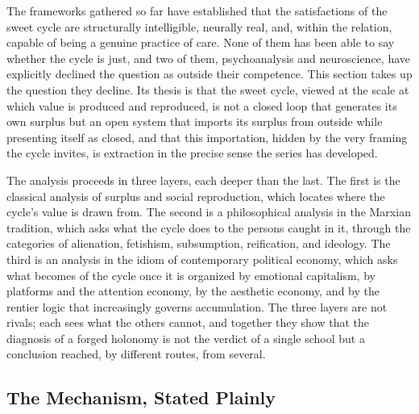 The frameworks gathered so far have established that the satisfactions of the sweet cycle are structurally intelligible, neurally real, and, within the relation, capable of being a genuine practice of care. None of them has been able to say whether the cycle is just, and two of them, psychoanalysis and neuroscience, have explicitly declined the question as outside their competence. This section takes up the question they decline. Its thesis is that the sweet cycle, viewed at the scale at which value is produced and reproduced, is not a closed loop that generates its own surplus but an open system that imports its surplus from outside while presenting itself as closed, and that this importation, hidden by the very framing the cycle invites, is extraction in the precise sense the series has developed.

The analysis proceeds in three layers, each deeper than the last. The first is the classical analysis of surplus and social reproduction, which locates where the cycle's value is drawn from. The second is a philosophical analysis in the Marxian tradition, which asks what the cycle does to the persons caught in it, through the categories of alienation, fetishism, subsumption, reification, and ideology. The third is an analysis in the idiom of contemporary political economy, which asks what becomes of the cycle once it is organized by emotional capitalism, by platforms and the attention economy, by the aesthetic economy, and by the rentier logic that increasingly governs accumulation. The three layers are not rivals; each sees what the others cannot, and together they show that the diagnosis of a forged holonomy is not the verdict of a single school but a conclusion reached, by different routes, from several.

\subsection{The Mechanism, Stated Plainly}

